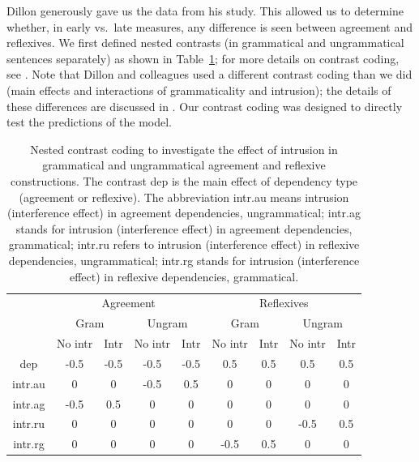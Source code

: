 \documentclass{cambridge7A}\usepackage[]{graphicx}\usepackage[]{color}
\begin{document}
Dillon generously gave us the data from his study. This allowed us to  determine whether, in early vs.\ late measures, any difference is seen between agreement and reflexives. We first defined nested contrasts (in grammatical and ungrammatical sentences separately) as shown in Table~\ref{dillon13nestedcoding}; for more details on contrast coding, see \cite{SchadEtAlcontrasts}. Note that Dillon and colleagues used a different contrast coding than we did (main effects and interactions of grammaticality and intrusion); the details of these differences are discussed in \cite{JaegerMertzenVanDykeVasishth2019}. Our contrast coding was designed to directly test the predictions of the \cite{LewisVasishth2005} model.

\begin{table}[!htbp]
\begin{center}
\begin{tabular}{ccccccccc}
      & \multicolumn{4}{c}{Agreement} &  \multicolumn{4}{c}{Reflexives} \\
      & \multicolumn{2}{c}{Gram} & \multicolumn{2}{c}{Ungram} & \multicolumn{2}{c}{Gram} & \multicolumn{2}{c}{Ungram} \\  
      & No intr & Intr & No intr & Intr & No intr & Intr & No intr & Intr \\   
dep   & -0.5  & -0.5  & -0.5  & -0.5  &  0.5  &  0.5  &  0.5  &  0.5\\
intr.au &  0  &  0  & -0.5  &  0.5  &  0  &  0  &  0  &  0\\
intr.ag & -0.5  &  0.5  &  0  &  0 &    0  &  0  &  0  &  0\\
intr.ru & 0   & 0   & 0   & 0  &   0    & 0 &  -0.5 &   0.5\\
intr.rg & 0   & 0   & 0   & 0  &  -0.5  &  0.5  & 0 &   0\\
\end{tabular}
\end{center}
\caption{Nested contrast coding to investigate the effect of intrusion in grammatical and ungrammatical agreement and reflexive constructions. The contrast dep is the main effect of dependency type (agreement or reflexive). The abbreviation intr.au means intrusion (interference effect) in agreement dependencies, ungrammatical; intr.ag stands for intrusion (interference effect) in agreement dependencies, grammatical; intr.ru refers to intrusion (interference effect) in reflexive dependencies, ungrammatical; intr.rg stands for intrusion (interference effect) in reflexive dependencies, grammatical.}
\label{dillon13nestedcoding}
\end{table}%
\end{document}
